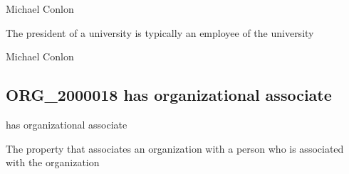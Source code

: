 \documentclass[letterpaper,10pt,english]{sphinxmanual}
\begin{document}
\begin{sphinxShadowBox}

\sphinxAtStartPar
Michael Conlon 
\end{sphinxShadowBox}

\begin{sphinxShadowBox}

\sphinxAtStartPar
The president of a university is typically an employee of the university
\end{sphinxShadowBox}

\begin{sphinxShadowBox}

\sphinxAtStartPar
{}
\end{sphinxShadowBox}

\begin{sphinxShadowBox}

\sphinxAtStartPar
Michael Conlon 
\end{sphinxShadowBox}
\begin{quote}

\ignorespaces \end{quote}


\subsection{ORG\_2000018 \sphinxhyphen{} has organizational associate}
\label{\detokenize{doc-ORG_2000018:org-2000018-has-organizational-associate}}\label{\detokenize{doc-ORG_2000018:index-0}}\label{\detokenize{doc-ORG_2000018::doc}}
\begin{sphinxShadowBox}

\sphinxAtStartPar
has organizational associate
\end{sphinxShadowBox}

\begin{sphinxShadowBox}

\sphinxAtStartPar
The property that associates an organization with a person who is associated with the organization
\end{sphinxShadowBox}
\end{document}
